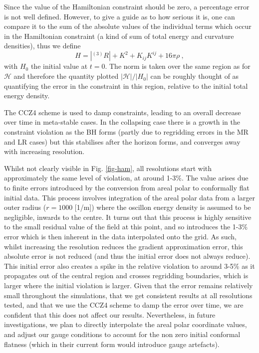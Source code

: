 \documentclass[11pt,a4paper]{article}
\begin{document}
Since the value of the Hamiltonian constraint should be zero, a percentage error is not well defined. However, to give a guide as to how serious it is, one can compare it to the sum of the absolute values of the individual terms which occur in the Hamiltonian constraint (a kind of sum of total energy and curvature densities), thus we define
\begin{equation}
	H = |{}^{(3)} R | + K^2 + K_{ij} K^{ij} + 16 \pi \rho ~ ,
\end{equation}
with $H_0$ the initial value at $t=0$. The norm is taken over the same region as for $\mathcal{H}$ and therefore the quantity plotted $|\mathcal{H}|/ |H_0|$ can be roughly thought of as quantifying the error in the constraint in this region, relative to the initial total energy density.

The CCZ4 scheme is used to damp constraints, leading to an overall decrease over time in meta-stable cases. In the collapsing case there is a growth in the constraint violation as the BH forms (partly due to regridding errors in the MR and LR cases) but this stabilises after the horizon forms, and converges away with increasing resolution.

Whilst not clearly visible in Fig. \ref{fig-ham}, all resolutions start with approximately the same level of violation, at around 1-3\%. The value arises due to finite errors introduced by the conversion from areal polar to conformally flat initial data. This process involves integration of the areal polar data from a larger outer radius ($r=1000$ [1/m]) where the oscillon energy density is assumed to be negligible, inwards to the centre. It turns out that this process is highly sensitive to the small residual value of the field at this point, and so introduces the 1-3\% error which is then inherent in the data interpolated onto the grid. As such, whilst increasing the resolution reduces the gradient approximation error, this absolute error is not reduced (and thus the initial error does not always reduce). This initial error also creates a spike in the relative violation to around 3-5\% as it propagates out of the central region and crosses regridding boundaries, which is larger where the initial violation is larger. Given that the error remains relatively small throughout the simulations, that we get consistent results at all resolutions tested, and that we use the CCZ4 scheme to damp the error over time, we are confident that this does not affect our results. Nevertheless, in future investigations, we plan to directly interpolate the areal polar coordinate values, and adjust our gauge conditions to account for the non zero initial conformal flatness (which in their current form would introduce gauge artefacts).
\end{document}
